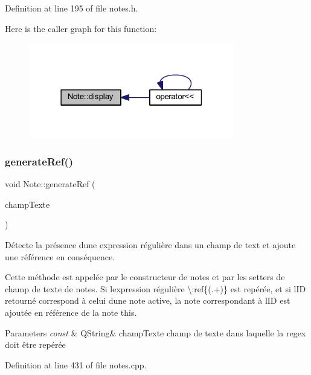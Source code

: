 Definition at line 195 of file notes.\+h.

Here is the caller graph for this function\+:\nopagebreak
\begin{figure}[H]
\begin{center}
\leavevmode
\includegraphics[width=254pt]{class_note_a0398c75a4e1516fd8455bd3513151b8b_icgraph}
\end{center}
\end{figure}
\mbox{\label{class_note_a5a0cb370ddd5a3da10fe8aa8a256d661}} 
\subsubsection{\texorpdfstring{generate\+Ref()}{generateRef()}}
{\footnotesize\ttfamily void Note\+::generate\+Ref (\begin{DoxyParamCaption}\item[{const Q\+String \&}]{champ\+Texte }\end{DoxyParamCaption})}



Détecte la présence d\textquotesingle{}une expression régulière dans un champ de text et ajoute une référence en conséquence. 

Cette méthode est appelée par le constructeur de notes et par les setters de champ de texte de notes. Si l\textquotesingle{}expression régulière \textbackslash{}\+:ref\{(.+)\} est repérée, et si l\textquotesingle{}ID retourné correspond à celui d\textquotesingle{}une note active, la note correspondant à l\textquotesingle{}ID est ajoutée en référence de la note this. 
\begin{DoxyParams}{Parameters}
{\em const} & Q\+String\& champ\+Texte champ de texte dans laquelle la regex doit être repérée \\
\hline
\end{DoxyParams}


Definition at line 431 of file notes.\+cpp.

